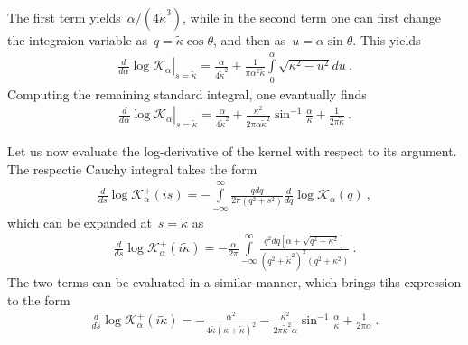 \documentclass[preprint,aps,eqsecnum]{revtex4-1}
\newcommand{\fplus}[1]{{#1}^{+}}
\begin{document}
The first term yields~$\alpha /(4{\tilde\kappa}^3)$, while in
the second term one can first change the integraion variable
as~$q = {\tilde\kappa}\cos\theta$, and then as~$u = \alpha \sin\theta$.
This yields
\begin{align}
  \left.\frac{d}{d\alpha}\log \mathcal{K}_{\alpha}
  \right|_{s = {\tilde\kappa}}
  = \frac{\alpha}{4{\tilde\kappa}^2} + \frac{1}{\pi\alpha^2 {\tilde\kappa}}
  \int\limits_{0}^{\alpha} \sqrt{\kappa^2 - u^2} du\ .
\end{align}
Computing the remaining standard integral, one evantually finds
\begin{align}
  \label{eq:appA-1st-half}
  \left.\frac{d}{d\alpha}\log \mathcal{K}_{\alpha}
  \right|_{s = {\tilde\kappa}}
  = \frac{\alpha}{4{\tilde\kappa}^2}
  + \frac{\kappa^2}{2\pi\alpha{\tilde\kappa}^2} \sin^{-1}\frac{\alpha}{\kappa}
  + \frac{1}{2\pi{\tilde\kappa}}\ .
\end{align}

Let us now evaluate the log-derivative of the kernel with respect
to its argument. The respectie Cauchy integral takes the form
\begin{align}
  \frac{d}{ds} \log \fplus{\mathcal{K}}_{\alpha}(is)
  = -\int\limits_{-\infty}^{\infty} \frac{qdq}{2\pi (q^2 + s^2)}
  \frac{d}{dq} \log \mathcal{K}_\alpha(q)\ ,
\end{align}
which can be expanded at~$s = {\tilde\kappa}$ as
\begin{align}
  \frac{d}{ds} \log \fplus{\mathcal{K}}_{\alpha}(i{\tilde\kappa})
  = - \frac{\alpha}{2\pi}
  \int\limits_{-\infty}^{\infty}
  \frac{q^2 dq \left[\alpha + \sqrt{q^2 + \kappa^2}\right]}{
     (q^2 + {\tilde \kappa}^2)^2 (q^2 + \kappa^2)
  }\ .
\end{align}
The two terms can be evaluated in a similar manner, which brings
tihs expression to the form
\begin{align}
  \label{eq:appA-2nd-half}
  \frac{d}{ds} \log \fplus{\mathcal{K}}_{\alpha}(i{\tilde\kappa})
  = - \frac{\alpha^2}{4{\tilde \kappa} (\kappa + {\tilde\kappa})^2}
  - \frac{\kappa^2}{2\pi{\tilde\kappa}^2 \alpha}
  \sin^{-1}\frac{\alpha}{\kappa} + \frac{1}{2\pi\alpha}\ .
\end{align}
\end{document}
